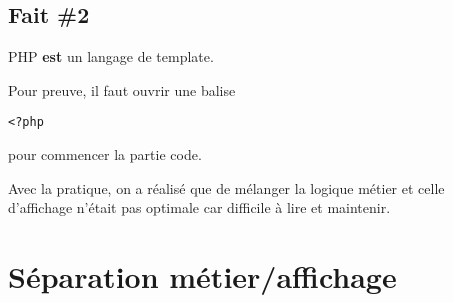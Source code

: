 \begin{otherlanguage}{english}
\begin{Shaded}
\begin{Highlighting}[]
    \NormalTok{ = }\OtherTok{(}\NormalTok{::}\OtherTok{);}
\StringTok{["}\StringTok{"] ?>"}
\NormalTok{        <} 
\NormalTok{        <} 
\NormalTok{>}
\NormalTok{<}
\OtherTok{:}
\NormalTok{<}
\end{Highlighting}
\end{Shaded}

\end{otherlanguage}

\hypertarget{fait-2}{%
\subsection{Fait \#2}\label{fait-2}}

PHP \textbf{est} un langage de template.

Pour preuve, il faut ouvrir une balise
\begin{otherlanguage}{english}\texttt{\textless{}?php}\end{otherlanguage}
pour commencer la partie code.

Avec la pratique, on a réalisé que de mélanger la logique métier et
celle d'affichage n'était pas optimale car difficile à lire et
maintenir.

\hypertarget{suxe9paration-muxe9tieraffichage}{%
\section{Séparation
métier/affichage}\label{suxe9paration-muxe9tieraffichage}}

